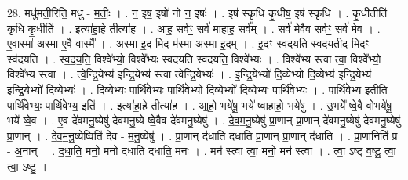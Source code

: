 \documentclass[17pt]{extarticle}
\begin{document}
28. मधु॑मती॒रिति॒ मधु॑ - म॒तीः॒ । . न॒ इष॒ इषो॑ नो न॒ इषः॑ । . इष॑ स्कृधि कृ॒धीष॒ इष॑ स्कृधि । . कृ॒धीतीति॑ कृधि कृ॒धीति॑ । . इत्या॑हा॒हे तीत्या॑ह । . आ॒ह॒ सर्वꣳ॒॒ सर्व॑ माहाह॒ सर्व᳚म् । . सर्व॑ मे॒वैव सर्वꣳ॒॒ सर्व॑ मे॒व । . ए॒वास्मा॑ अस्मा ए॒वै वास्मै᳚ । . अ॒स्मा॒ इ॒द मि॒द म॑स्मा अस्मा इ॒दम् । . इ॒दꣳ स्व॑दयति स्वदयती॒द मि॒दꣳ स्व॑दयति । . स्व॒द॒य॒ति॒ विश्वे᳚भ्यो॒ विश्वे᳚भ्यः स्वदयति स्वदयति॒ विश्वे᳚भ्यः । . विश्वे᳚भ्य स्त्वा त्वा॒ विश्वे᳚भ्यो॒ विश्वे᳚भ्य स्त्वा । . त्वे॒न्द्रि॒येभ्य॑ इन्द्रि॒येभ्य॑ स्त्वा त्वेन्द्रि॒येभ्यः॑ । . इ॒न्द्रि॒येभ्यो॑ दि॒व्येभ्यो॑ दि॒व्येभ्य॑ इन्द्रि॒येभ्य॑ इन्द्रि॒येभ्यो॑ दि॒व्येभ्यः॑ । . दि॒व्येभ्यः॒ पार्थि॑वेभ्यः॒ पार्थि॑वेभ्यो दि॒व्येभ्यो॑ दि॒व्येभ्यः॒ पार्थि॑वेभ्यः । . पार्थि॑वेभ्य॒ इतीति॒ पार्थि॑वेभ्यः॒ पार्थि॑वेभ्य॒ इति॑ । . इत्या॑हा॒हे तीत्या॑ह । . आ॒हो॒ भये॑षू॒ भये᳚ ष्वाहाहो॒ भये॑षु । . उ॒भये᳚ ष्वे॒वै वोभये॑षू॒ भये᳚ ष्वे॒व । . ए॒व दे॑वमनु॒ष्येषु॑ देवमनु॒ष्ये ष्वे॒वैव दे॑वमनु॒ष्येषु॑ । . दे॒व॒म॒नु॒ष्येषु॑ प्रा॒णान् प्रा॒णान् दे॑वमनु॒ष्येषु॑ देवमनु॒ष्येषु॑ प्रा॒णान् । . दे॒व॒म॒नु॒ष्येष्विति॑ देव - म॒नु॒ष्येषु॑ । . प्रा॒णान् द॑धाति दधाति प्रा॒णान् प्रा॒णान् द॑धाति । . प्रा॒णानिति॑ प्र - अ॒नान् । . द॒धा॒ति॒ मनो॒ मनो॑ दधाति दधाति॒ मनः॑ । . मन॑ स्त्वा त्वा॒ मनो॒ मन॑ स्त्वा । . त्वा॒ ऽष्ट् व॒ष्टु॒ त्वा॒ त्वा॒ ऽष्टु॒ । \newline
\end{document}
